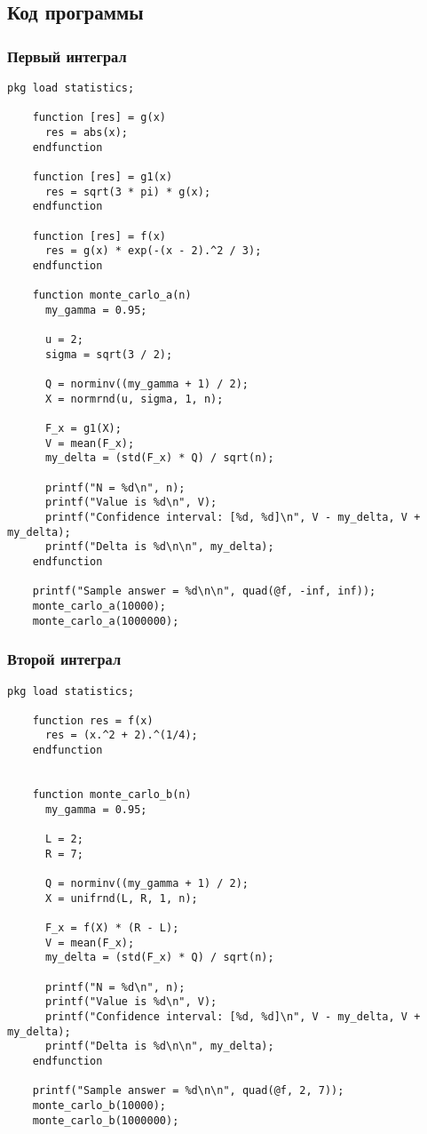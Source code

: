 \documentclass{article}
\begin{document}
        \subsection{Код программы}
            \subsubsection{Первый интеграл}
\begin{lstlisting}[caption={a.m}]
    pkg load statistics;

    function [res] = g(x)
      res = abs(x);
    endfunction
    
    function [res] = g1(x)
      res = sqrt(3 * pi) * g(x);
    endfunction
    
    function [res] = f(x)
      res = g(x) * exp(-(x - 2).^2 / 3);
    endfunction
    
    function monte_carlo_a(n)
      my_gamma = 0.95;
      
      u = 2;
      sigma = sqrt(3 / 2);
      
      Q = norminv((my_gamma + 1) / 2);
      X = normrnd(u, sigma, 1, n);
      
      F_x = g1(X);
      V = mean(F_x);
      my_delta = (std(F_x) * Q) / sqrt(n);
      
      printf("N = %d\n", n);
      printf("Value is %d\n", V);
      printf("Confidence interval: [%d, %d]\n", V - my_delta, V + my_delta);
      printf("Delta is %d\n\n", my_delta);
    endfunction
    
    printf("Sample answer = %d\n\n", quad(@f, -inf, inf));
    monte_carlo_a(10000);
    monte_carlo_a(1000000);
\end{lstlisting}
            \subsubsection{Второй интеграл}
\begin{lstlisting}[caption={b.m}]
    pkg load statistics;

    function res = f(x)
      res = (x.^2 + 2).^(1/4);
    endfunction

    
    function monte_carlo_b(n)
      my_gamma = 0.95;
      
      L = 2;
      R = 7;
      
      Q = norminv((my_gamma + 1) / 2);
      X = unifrnd(L, R, 1, n);
      
      F_x = f(X) * (R - L);
      V = mean(F_x);
      my_delta = (std(F_x) * Q) / sqrt(n);
      
      printf("N = %d\n", n);
      printf("Value is %d\n", V);
      printf("Confidence interval: [%d, %d]\n", V - my_delta, V + my_delta);
      printf("Delta is %d\n\n", my_delta);
    endfunction
    
    printf("Sample answer = %d\n\n", quad(@f, 2, 7));
    monte_carlo_b(10000);
    monte_carlo_b(1000000);
\end{lstlisting}
\end{document}
